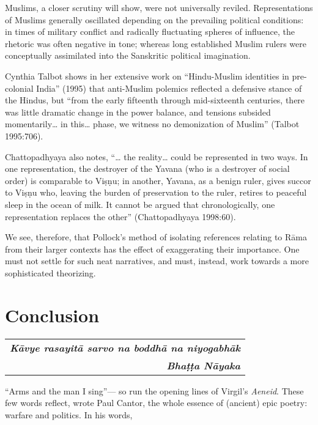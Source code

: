Muslims, a closer scrutiny will show, were not universally reviled. Representations of Muslims generally oscillated depending on the prevailing political conditions: in times of military conflict and radically fluctuating spheres of influence, the rhetoric was often negative in tone; whereas long established Muslim rulers were conceptually assimilated into the Sanskritic political imagination. 

Cynthia Talbot shows in her extensive work on “Hindu-Muslim identities in pre-colonial India” (1995) that anti-Muslim polemics reflected a defensive stance of the Hindus, but “from the early fifteenth through mid-sixteenth centuries, there was little dramatic change in the power balance, and tensions subsided momentarily… in this… phase, we witness no demonization of Muslim” (Talbot 1995:706). 

Chattopadhyaya also notes, “… the reality… could be represented in two ways. In one representation, the destroyer of the Yavana (who is a destroyer of social order) is comparable to Viṣṇu; in another, Yavana, as a benign ruler, gives succor to Viṣṇu who, leaving the burden of preservation to the ruler, retires to peaceful sleep in the ocean of milk. It cannot be argued that chronologically, one representation replaces the other” (Chattopadhyaya 1998:60). 

We see, therefore, that Pollock’s method of isolating references relating to Rāma from their larger contexts has the effect of exaggerating their importance. One must not settle for such neat narratives, and must, instead, work towards a more sophisticated theorizing. 

\newpage

\section*{Conclusion}\label{conclusion}

\medskip
\begin{flushright}
\begin{tabular}{r@{}}
{\sl\bfseries Kāvye rasayitā sarvo na boddhā na niyogabhāk}\\[3pt]
{\sl\bfseries  Bhaṭṭa Nāyaka}\index{Bhatta Nayaka@Bhaṭṭa Nāyaka}
\end{tabular}
\end{flushright}

“Arms and the man I sing”— so run the opening lines of Virgil’s {\sl Aeneid}. These few words reflect, wrote Paul Cantor, the whole essence of (ancient) epic poetry: warfare and politics. In his words, 

